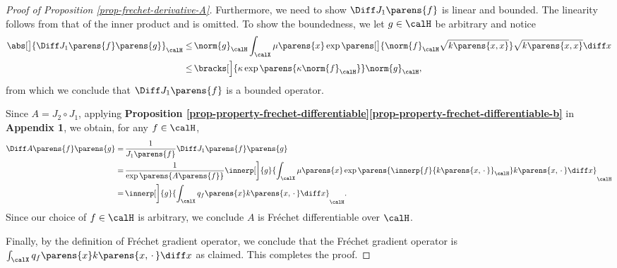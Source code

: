 \documentclass[12pt]{article}
\theoremstyle{definition}
\theoremstyle{theorem}
\theoremstyle{remark}
\begin{document}
\begin{proof}[Proof of Proposition \ref{prop-frechet-derivative-A}]
	Furthermore, we need to show $\Diff J_1 \parens{f}$ is linear and bounded. The linearity follows from that of the inner product and is omitted. To show the boundedness, we let $g \in \calH$ be arbitrary and notice 
	\begin{align*}
		\abs[\big]{\Diff J_1 \parens{f} \parens{g}}_{\calH} 
		\le & \, \norm{g}_{\calH} \int_{\calX} \mu \parens{x} \exp \parens[\big]{\norm{f}_{\calH} \sqrt{k \parens{x, x}} } \sqrt{k \parens{x, x}} \diff x \nonumber \\ 
		\le & \, \bracks[\Big]{\kappa \exp \parens{ \kappa \norm{f}_{\calH} }} \norm{g}_{\calH}, 
	\end{align*}
	from which we conclude that $\Diff J_1 \parens{f}$ is a bounded operator. 
	
	Since $A = J_2 \circ J_1$, applying {\color{red} \textbf{Proposition \ref{prop-property-frechet-differentiable}\ref{prop-property-frechet-differentiable-b}}} in \textbf{\color{red} Appendix 1}, we obtain, for any $f \in \calH$, 
	\begin{align*}
		\Diff A \parens{f} \parens{g} 
		= & \, \frac{1}{J_1 \parens{f}} \Diff J_1 \parens{f} \parens{g} \\ 
		= & \, \frac{1}{\exp \parens{A \parens{f}}} \innerp[\bigg]{g}{\int_{\calX} \mu \parens{x} \exp \parens{\innerp{f}{k \parens{x, \,\cdot\,}}_{\calH}} k \parens{x, \,\cdot\,} \diff x}_{\calH} \\ 
		= & \, \innerp[\bigg]{g}{\int_{\calX} q_f \parens{x} k \parens{x, \,\cdot\,} \diff x} _{\calH}. 
	\end{align*}
	Since our choice of $f \in \calH$ is arbitrary, we conclude $A$ is Fr{\'e}chet differentiable over $\calH$. 
	
	Finally, by the definition of Fr{\'e}chet gradient operator, we conclude that the Fr{\'e}chet gradient operator is $\int_{\calX} q_f \parens{x} k \parens{x, \,\cdot\,} \diff x$ as claimed. This completes the proof. 
	
\end{proof}
\end{document}
